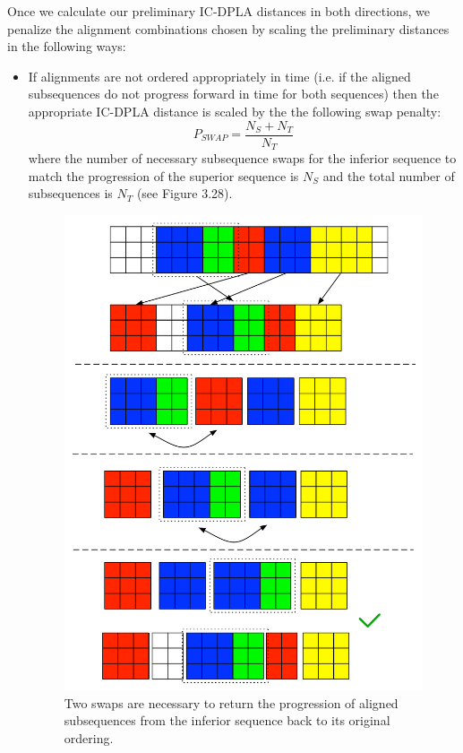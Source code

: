 \documentclass[12pt]{report} 	%
\numberwithin{figure}{chapter}
\numberwithin{table}{chapter}
\numberwithin{equation}{chapter}
\begin{document}
\begin{flushleft}
Once we calculate our preliminary IC-DPLA distances in both directions, we penalize the alignment combinations chosen by scaling the preliminary distances in the following ways:
\begin{itemize}
\item If alignments are not ordered appropriately in time (i.e. if the aligned subsequences do not progress forward in time for both sequences) then the appropriate IC-DPLA distance is scaled by the the following swap penalty:
\begin{equation}
P_{SWAP} = \frac{N_S+N_T}{N_T}
\end{equation}
where the number of necessary subsequence swaps for the inferior sequence to match the progression of the superior sequence is $N_S$ and the total number of subsequences is $N_T$ (see Figure 3.28).
\begin{figure}[h!]
\begin{center}
\includegraphics[scale=0.7]{Penalty_1}
\caption[Penalizing swaps]{Two swaps are necessary to return the progression of aligned subsequences from the inferior sequence back to its original ordering.}

\end{center}
\end{figure}
\end{itemize}
\end{flushleft}
\end{document}
